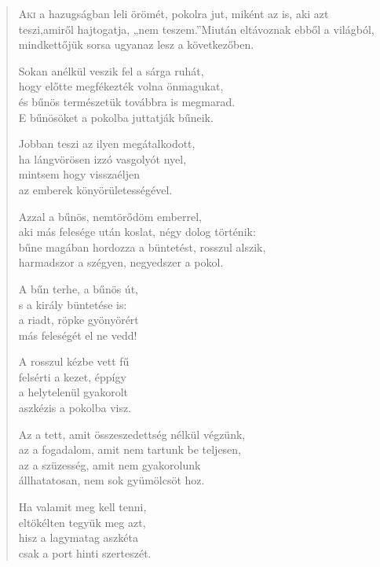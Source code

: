 
\begin{verse}

{\par%
\lettrine{A}{ki} {\LettrineTextFont a hazugságban leli örömét, pokolra jut,}\newline
miként az is, aki azt teszi,\newline amiről hajtogatja,
„nem teszem.”\verselinebreak Miután eltávoznak ebből a világból,\verselinebreak
mindkettőjük sorsa ugyanaz lesz a következőben.
\par}

 Sokan anélkül veszik fel a sárga ruhát,\\
hogy előtte megfékezték volna önmagukat,\\
és bűnös természetük továbbra is megmarad.\\
E bűnösöket a pokolba juttatják bűneik.

 Jobban teszi az ilyen megátalkodott,\\
ha lángvörösen izzó vasgolyót nyel,\\
mintsem hogy visszaéljen\\
az emberek könyörületességével.

 Azzal a bűnös, nemtörődöm emberrel,\\
aki más felesége után koslat, négy dolog történik:\\
bűne magában hordozza a büntetést, rosszul alszik,\\
harmadszor a szégyen, negyedszer a pokol.

 A bűn terhe, a bűnös út,\\
s a király büntetése is:\\
a riadt, röpke gyönyörért\\
más feleségét el ne vedd!

 A rosszul kézbe vett fű\\
felsérti a kezet, éppígy\\
a helytelenül gyakorolt\\
aszkézis a pokolba visz.

 Az a tett, amit összeszedettség nélkül végzünk,\\
az a fogadalom, amit nem tartunk be teljesen,\\
az a szüzesség, amit nem gyakorolunk\\
állhatatosan, nem sok gyümölcsöt hoz.

 Ha valamit meg kell tenni,\\
eltökélten tegyük meg azt,\\
hisz a lagymatag aszkéta\\
csak a port hinti szerteszét.


\end{verse}
